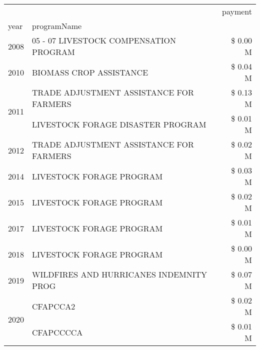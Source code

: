 \begin{tabular}{llr}
\toprule
 &  & payment \\
year & programName &  \\
\midrule
2008 & 05 - 07 LIVESTOCK COMPENSATION PROGRAM & \$ 0.00 M \\
\cline{1-3}
2010 & BIOMASS CROP ASSISTANCE & \$ 0.04 M \\
\cline{1-3}
\multirow[t]{2}{*}{2011} & TRADE ADJUSTMENT ASSISTANCE FOR FARMERS & \$ 0.13 M \\
 & LIVESTOCK FORAGE DISASTER PROGRAM & \$ 0.01 M \\
\cline{1-3}
2012 & TRADE ADJUSTMENT ASSISTANCE FOR FARMERS & \$ 0.02 M \\
\cline{1-3}
2014 & LIVESTOCK FORAGE PROGRAM & \$ 0.03 M \\
\cline{1-3}
2015 & LIVESTOCK FORAGE PROGRAM & \$ 0.02 M \\
\cline{1-3}
2017 & LIVESTOCK FORAGE PROGRAM & \$ 0.01 M \\
\cline{1-3}
2018 & LIVESTOCK FORAGE PROGRAM & \$ 0.00 M \\
\cline{1-3}
2019 & WILDFIRES AND HURRICANES INDEMNITY PROG & \$ 0.07 M \\
\cline{1-3}
\multirow[t]{2}{*}{2020} & CFAPCCA2 & \$ 0.02 M \\
 & CFAPCCCCA & \$ 0.01 M \\
\cline{1-3}
\bottomrule
\end{tabular}
